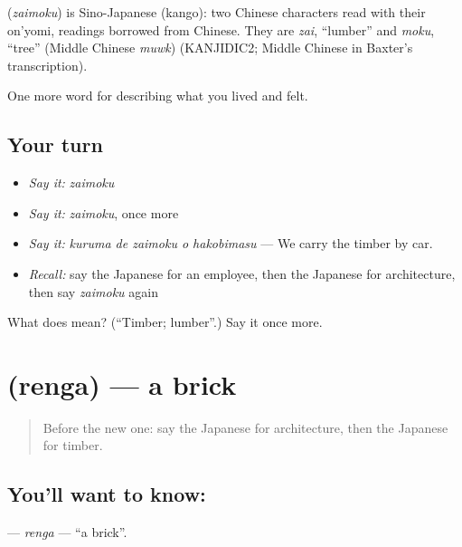 \begin{cousinweb}
\textbf{} (\emph{zaimoku}) is Sino-Japanese (kango): two Chinese characters read with their on'yomi, readings borrowed from Chinese. They are \emph{zai}, \textquotedblleft{}lumber\textquotedblright{} and \emph{moku}, \textquotedblleft{}tree\textquotedblright{} (Middle Chinese \emph{muwk}) (KANJIDIC2; Middle Chinese in Baxter's transcription).
\end{cousinweb}

\begin{grammarlens}[title={What you've built}]
One more word for describing what you lived and felt.
\end{grammarlens}

\subsection*{Your turn}
\begin{itemize}
\raggedright
  \item \emph{Say it:} \emph{zaimoku}
  \item \emph{Say it:} \emph{zaimoku}, once more
  \item \emph{Say it:} \emph{kuruma de zaimoku o hakobimasu} — We carry the timber by car.
  \item \emph{Recall:} say the Japanese for an employee, then the Japanese for architecture, then say \emph{zaimoku} again
\end{itemize}

\begin{tcolorbox}[breakable,colback=teal!4,colframe=teal!35!black,title={Before you move on}]
What does  mean? (\textquotedblleft{}Timber; lumber\textquotedblright{}.) Say it once more.
\end{tcolorbox}
\section[\texorpdfstring{\ja{れんが} (renga)}{れんが (renga)}]{ (renga) — a brick}

\label{lesson:JA-C488-renga}



\begin{quote}
Before the new one: say the Japanese for architecture, then the Japanese for timber.
\end{quote}

\subsection*{You'll want to know: }
\textbf{} — \emph{renga} — \textquotedblleft{}a brick\textquotedblright{}.

